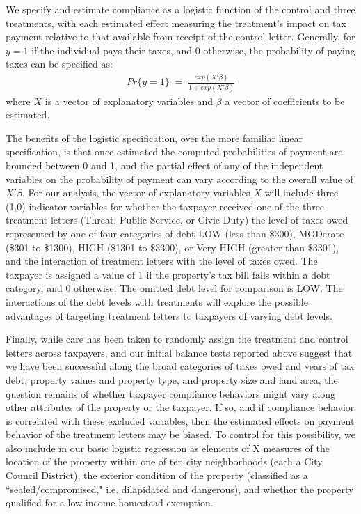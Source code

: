 \documentclass[12pt,titlepage]{article}
\begin{document}
We specify and estimate compliance
as a logistic function of the control and three treatments, with each
estimated effect measuring the treatment's impact on tax payment
relative to that available from receipt of the control letter.
Generally, for $y = 1$ if the individual pays their taxes, and 0
otherwise, the probability of paying taxes can be specified as:
\begin{eqnarray*}
Pr \{ y=1 \} \; = \; \frac{exp(X' \beta)}{1 + exp(X' \beta)}
\end{eqnarray*}
where $X$ is a vector of explanatory variables and $\beta$ a vector of
coefficients to be estimated.

The benefits of the logistic specification, over the more familiar
linear specification, is that once estimated the computed
probabilities of payment are bounded between 0 and 1, and the partial
effect of any of the independent variables on the probability of
payment can vary according to the overall value of $X'\beta$.  For our
analysis, the vector of explanatory variables $X$ will include three
(1,0) indicator variables for whether the taxpayer received one of the
three treatment letters (Threat, Public Service, or Civic Duty) the
level of taxes owed represented by one of four categories of debt
LOW (less than \$300), MODerate (\$301 to \$1300), HIGH (\$1301 to
\$3300), or Very HIGH (greater than \$3301), and the interaction of
treatment letters with the level of taxes owed.  The taxpayer is
assigned a value of 1 if the property's tax bill falls within a debt
category, and 0 otherwise.  The omitted debt level for comparison is
LOW.  The interactions of the debt levels with treatments will explore
the possible advantages of targeting treatment letters to taxpayers of
varying debt levels.

Finally, while care has been taken to randomly assign the treatment
and control letters across taxpayers, and our initial balance tests
reported above suggest that we have been successful along the broad
categories of taxes owed and years of tax debt, property values and
property type, and property size and land area, the question remains
of whether taxpayer compliance behaviors might vary along other
attributes of the property or the taxpayer.  If so, and if compliance
behavior is correlated with these excluded variables, then the
estimated effects on payment behavior of the treatment letters may be
biased.  To control for this possibility, we also include in our basic
logistic regression as elements of X measures of the location of the
property within one of ten city neighborhoods (each a City Council
District), the exterior condition of the property (classified as a
``sealed/compromised," i.e. dilapidated and dangerous), and whether
the property qualified for a low income homestead exemption.  
\end{document}
